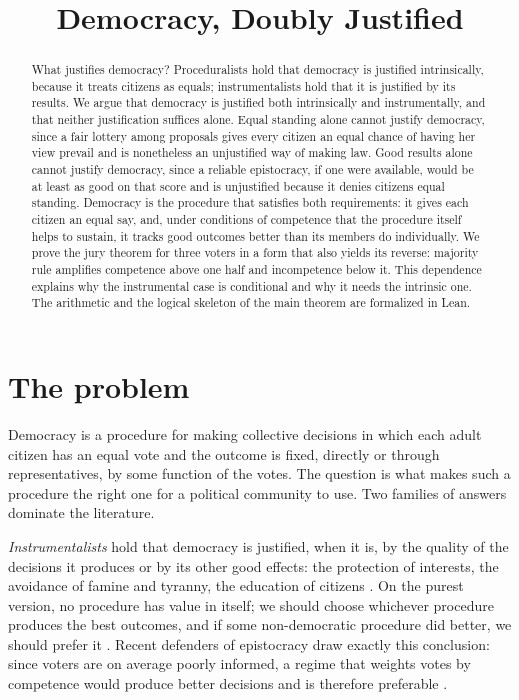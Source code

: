 \documentclass{situationist-preprint}
\title{Democracy, Doubly Justified}
\begin{document}
\maketitle

\begin{abstract}
What justifies democracy? Proceduralists hold that democracy is justified intrinsically, because it treats citizens as equals; instrumentalists hold that it is justified by its results. We argue that democracy is justified both intrinsically and instrumentally, and that neither justification suffices alone. Equal standing alone cannot justify democracy, since a fair lottery among proposals gives every citizen an equal chance of having her view prevail and is nonetheless an unjustified way of making law. Good results alone cannot justify democracy, since a reliable epistocracy, if one were available, would be at least as good on that score and is unjustified because it denies citizens equal standing. Democracy is the procedure that satisfies both requirements: it gives each citizen an equal say, and, under conditions of competence that the procedure itself helps to sustain, it tracks good outcomes better than its members do individually. We prove the jury theorem for three voters in a form that also yields its reverse: majority rule amplifies competence above one half and incompetence below it. This dependence explains why the instrumental case is conditional and why it needs the intrinsic one. The arithmetic and the logical skeleton of the main theorem are formalized in Lean.
\end{abstract}

\section{The problem}

Democracy is a procedure for making collective decisions in which each adult citizen has an equal vote and the outcome is fixed, directly or through representatives, by some function of the votes. The question is what makes such a procedure the right one for a political community to use. Two families of answers dominate the literature.

\emph{Instrumentalists} hold that democracy is justified, when it is, by the quality of the decisions it produces or by its other good effects: the protection of interests, the avoidance of famine and tyranny, the education of citizens \citep[ch.~III]{MillCRG}. On the purest version, no procedure has value in itself; we should choose whichever procedure produces the best outcomes, and if some non-democratic procedure did better, we should prefer it \citep{Arneson2003}. Recent defenders of epistocracy draw exactly this conclusion: since voters are on average poorly informed, a regime that weights votes by competence would produce better decisions and is therefore preferable \citep{Brennan2016}.
\end{document}
